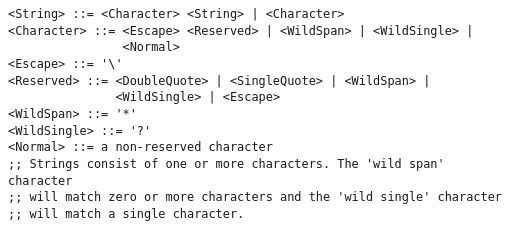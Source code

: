\condPage{}
\begin{verbatim}
<String> ::= <Character> <String> | <Character>
<Character> ::= <Escape> <Reserved> | <WildSpan> | <WildSingle> |
                <Normal>
<Escape> ::= '\'
<Reserved> ::= <DoubleQuote> | <SingleQuote> | <WildSpan> |
               <WildSingle> | <Escape>
<WildSpan> ::= '*'
<WildSingle> ::= '?'
<Normal> ::= a non-reserved character
;; Strings consist of one or more characters. The 'wild span' character
;; will match zero or more characters and the 'wild single' character
;; will match a single character.
\end{verbatim}
\outputEnd{}
\appendixEnd{}
